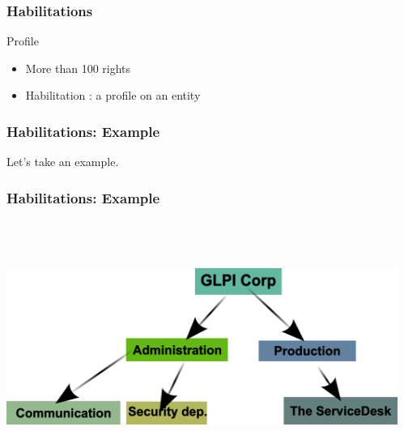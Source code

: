 \documentclass{beamer}
\begin{document}
\begin{frame}
\frametitle{Habilitations}
    \begin{block}{Profile}
        \begin{itemize}
            \item More than 100 rights
            \item Habilitation : a profile on an entity 
        \end{itemize}

    \end{block}
\end{frame}


\begin{frame}
\frametitle{Habilitations: Example}
Let's take an example.
\end{frame}

\begin{frame}
\frametitle{Habilitations: Example}
\begin{columns}
 \begin{column}{0.45\textwidth}
         \includegraphics[height=7.5cm]{./pics/entites.png}
 \end{column}
 \begin{column}{0.45\textwidth}
 \end{column}
\end{columns}
\end{frame}
\end{document}
